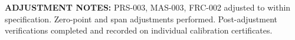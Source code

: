 \vspace{2pt}
\noindent\textcolor{NexaGold}{\scriptsize\faWrench\; \textbf{ADJUSTMENT NOTES:} PRS-003, MAS-003, FRC-002 adjusted to within specification. Zero-point and span adjustments performed. Post-adjustment verifications completed and recorded on individual calibration certificates.}

\vspace{6pt}
